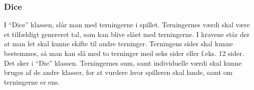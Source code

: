 \subsubsection{Dice}
I “Dice” klassen, slår man med terningerne i spillet. Terningernes værdi skal være et tilfældigt genereret tal, som kan blive slået med terningerne. I kravene står der at man let skal kunne skifte til andre terninger. Terningens sider skal kunne bestemmes, så man kan slå med to terninger med seks sider eller f.eks. 12 sider. Det sker i “Die” klassen. Terningernes sum, samt individuelle værdi skal kunne bruges af de andre klasser, for at vurdere hvor spilleren skal lande, samt om terningerne er ens.